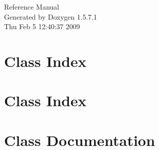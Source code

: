 \documentclass[a4paper]{book}
\begin{document}
\begin{titlepage}
\vspace*{7cm}
\begin{center}
{\Large Reference Manual}\\
\vspace*{1cm}
{\large Generated by Doxygen 1.5.7.1}\\
\vspace*{0.5cm}
{\small Thu Feb 5 12:40:37 2009}\\
\end{center}
\end{titlepage}
\clearemptydoublepage
{}
\tableofcontents
\clearemptydoublepage
{}
\chapter{Class Index}

\chapter{Class Index}

\chapter{Class Documentation}















\printindex
\end{document}
